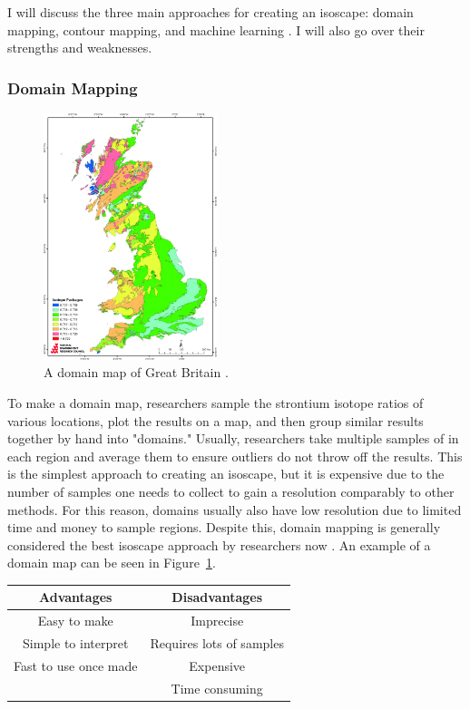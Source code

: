 \documentclass[a4paper, 12pt]{article}
\begin{document}
I will discuss the three main approaches for creating an isoscape: domain mapping,
contour mapping, and machine learning \citep{holt2021}. I will also go over their
strengths and weaknesses.
\subsubsection{Domain Mapping}
\begin{figure}[htbp]
    \centering
    \includegraphics[width=0.45\textwidth]{domain_mapping.jpg}
    \caption{A domain map of Great Britain \citep{evans2010}.}
    \label{fig:domain_mapping}
\end{figure}
To make a domain map, researchers sample the strontium isotope ratios of
various locations, plot the results on a map, and then group similar results
together by hand into "domains." Usually, researchers take multiple samples of
in each region and average them to ensure outliers do not throw off the results.
This is the simplest approach to creating an isoscape, but it is expensive due to the number
of samples one needs to collect to gain a resolution comparably to other methods. For this reason,
domains usually also have low resolution due to limited time and money to sample regions.
Despite this, domain mapping is generally considered the best isoscape approach by researchers
now \citep{holt2021}.
An example of a domain map can be seen in Figure~\ref{fig:domain_mapping}.


\begin{center}
    \begin{tabular}{||c | c||}
        \hline
        Advantages            & Disadvantages            \\ [0.5ex]
        \hline\hline
        Easy to make          & Imprecise                \\
        \hline
        Simple to interpret   & Requires lots of samples \\
        \hline
        Fast to use once made & Expensive                \\
        \hline
                              & Time consuming           \\ [1ex]
        \hline
    \end{tabular}
\end{center}
\end{document}
